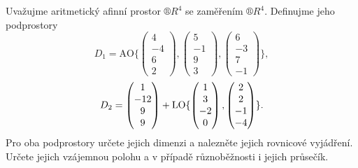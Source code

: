 \documentclass[12pt]{article}                   %
\begin{document}
\begin{priklad}[7.7]
	Uvažujme aritmetický afinní prostor $®R^4$ se zaměřením $®R^4$. Definujme jeho podprostory
	$$ D_1 = \text{AO}\{\begin{pmatrix} 4 \\ -4 \\ 6 \\ 2 \end{pmatrix}, \begin{pmatrix} 5 \\ -1 \\ 9 \\ 3 \end{pmatrix}, \begin{pmatrix} 6 \\ -3 \\ 7 \\ -1 \end{pmatrix}\}, $$
	$$ D_2 = \begin{pmatrix} 1 \\ -12 \\ 9 \\ 9 \end{pmatrix} + \operatorname{LO}\{\begin{pmatrix} 1 \\ 3 \\ -2 \\ 0 \end{pmatrix}, \begin{pmatrix} 2 \\ 2 \\ -1 \\ -4 \end{pmatrix}\}. $$
	Pro oba podprostory určete jejich dimenzi a nalezněte jejich rovnicové vyjádření. Určete jejich vzájemnou polohu a v případě různoběžnosti i jejich průsečík.


\end{priklad}
\end{document}
